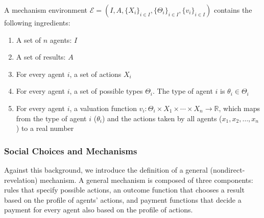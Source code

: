 \documentclass[11pt]{phdthesis}
\begin{document}
\begin{definition}
	A mechanism environment \sloppy $ \mathcal{E} = (I, A, \{X_i\}_{i \in I}, \{\Theta_{i}\}_{i \in I}, \{v_i\}_{i \in I}) $ contains the following ingredients:
	\begin{enumerate}
		\item A set of $n$ agents: $I$
		\item A set of results: $ A $
		\item For every agent $i$, a set of actions $X_i$
		\item For every agent $i$, a set of possible types $\Theta_i$. The type of agent $i$ is $\theta_i \in \Theta_i$
		\item For every agent $i$, a valuation function $v_i:\Theta_i \times X_1 \times \cdots \times X_n \rightarrow \mathbb{R}$, which maps from the type of agent $i$ ($ \theta_i $) and the actions taken by all agents ($ x_1,x_2,\ldots, x_n $) to a real number~\citep[Definition 9.40]{nisan2007algorithmic}
	\end{enumerate}
\end{definition}

\subsubsection{Social Choices and Mechanisms} \label{social choices and mechanisms}


Against this background, we introduce the definition of a general (nondirect-revelation) mechanism. A general mechanism is composed of three components: rules that specify possible actions, an outcome function that chooses a result based on the profile of agents' actions, and payment functions that decide a payment for every agent also based on the profile of actions.
\end{document}
